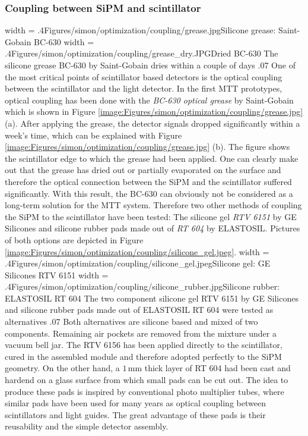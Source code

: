 \subsubsection{Coupling between SiPM and scintillator}
\doubleimage 
{width = .4\textwidth}{Figures/simon/optimization/coupling/grease.jpg}{Silicone grease: Saint-Gobain BC-630}
{width = .4\textwidth}{Figures/simon/optimization/coupling/grease_dry.JPG}{Dried BC-630}
{The silicone grease BC-630 by Saint-Gobain dries within a couple of days}
{.07\textwidth}
One of the most critical points of scintillator based detectors is the optical coupling between the scintillator and the light detector. In the first MTT prototypes, optical coupling has been done with the \emph{BC-630 optical grease} by Saint-Gobain which is shown in Figure \ref{image:Figures/simon/optimization/coupling/grease.jpg} (a). After applying the grease, the detector signals dropped significantly within a week's time, which can be explained with Figure \ref{image:Figures/simon/optimization/coupling/grease.jpg} (b). The figure shows the scintillator edge to which the grease had been applied. One can clearly make out that the grease has dried out or partially evaporated on the surface and therefore the optical connection between the SiPM and the scintillator suffered significantly. With this result, the BC-630 can obviously not be considered as a long-term solution for the MTT system. Therefore two other methods of coupling the SiPM to the scintillator have been tested: The silicone gel \emph{RTV 6151} by GE Silicones and silicone rubber pads made out of \emph{RT 604} by ELASTOSIL. Pictures of both options are depicted in Figure \ref{image:Figures/simon/optimization/coupling/silicone_gel.jpeg}.
\doubleimage
{width = .4\textwidth}{Figures/simon/optimization/coupling/silicone_gel.jpeg}{Silicone gel: GE Silicones RTV 6151}
{width = .4\textwidth}{Figures/simon/optimization/coupling/silicone_rubber.jpg}{Silicone rubber: ELASTOSIL RT 604}
{The two component silicone gel RTV 6151 by GE Silicones and silicone rubber pads made out of ELASTOSIL RT 604 were tested as alternatives}
{.07\textwidth}
Both alternatives are silicone based and mixed of two components. Remaining air pockets are removed from the mixture under a vacuum bell jar. The RTV 6156 has been applied directly to the scintillator, cured in the assembled module and therefore adopted perfectly to the SiPM geometry. On the other hand, a $1\,\text{mm}$ thick layer of RT 604 had been cast and hardend on a glass surface from which small pads can be cut out. The idea to produce these pads is inspired by conventional photo multiplier tubes, where similar pads have been used for many years as optical coupling between scintillators and light guides. The great advantage of these pads is their reusability and the simple detector assembly.

